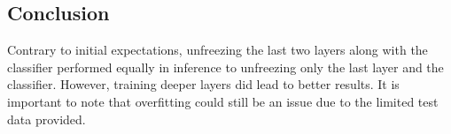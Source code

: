 \documentclass[10pt,twocolumn,letterpaper]{article}
\begin{document}
\subsection{Conclusion}
Contrary to initial expectations, unfreezing the last two layers along with the classifier performed equally in inference to unfreezing only the last layer and the classifier. However, training deeper layers did lead to better results. It is important to note that overfitting could still be an issue due to the limited test data provided.
{\small



}
\end{document}

